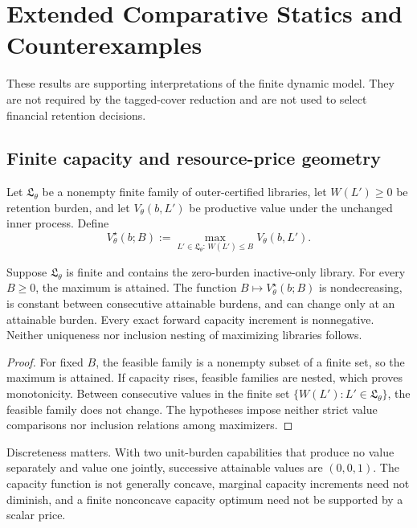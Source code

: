 \section{Extended Comparative Statics and Counterexamples}
\label{sec:or-extended-comparative-statics}

These results are supporting interpretations of the finite dynamic model.
They are not required by the tagged-cover reduction and are not used to select
financial retention decisions.





\subsection{Finite capacity and resource-price geometry}
\label{sec:or-capacity-price-geometry}

Let \(\mathfrak L_\theta\) be a nonempty finite family of outer-certified
libraries, let \(W(L')\geq0\) be retention burden, and let
\(V_\theta(b,L')\) be productive value under the unchanged inner process.
Define
\[
 V_\theta^\star(b;B)
 :=\max_{L'\in\mathfrak L_\theta:\,W(L')\leq B}V_\theta(b,L').
\]

\begin{theorem}
\label{thm:or-capacity-value}
Suppose \(\mathfrak L_\theta\) is finite and contains the zero-burden
inactive-only library. For every \(B\geq0\), the maximum is attained. The
function \(B\mapsto V_\theta^\star(b;B)\) is nondecreasing, is constant
between consecutive attainable burdens, and can change only at an attainable
burden. Every exact forward capacity increment is nonnegative. Neither
uniqueness nor inclusion nesting of maximizing libraries follows.
\end{theorem}

\begin{proof}
For fixed \(B\), the feasible family is a nonempty subset of a finite set, so
the maximum is attained. If capacity rises, feasible families are nested,
which proves monotonicity. Between consecutive values in the finite set
\(\{W(L'):L'\in\mathfrak L_\theta\}\), the feasible family does not change.
The hypotheses impose neither strict value comparisons nor inclusion relations
among maximizers.
\end{proof}

Discreteness matters. With two unit-burden capabilities that produce no value
separately and value one jointly, successive attainable values are
\((0,0,1)\). The capacity function is not generally concave, marginal capacity
increments need not diminish, and a finite nonconcave capacity optimum need
not be supported by a scalar price.


